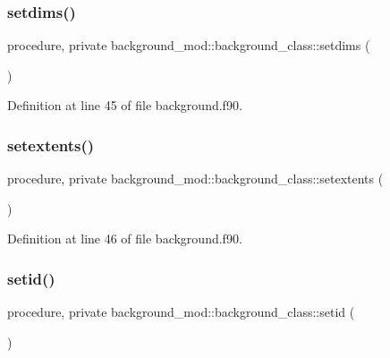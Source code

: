 \subsubsection{\texorpdfstring{setdims()}{setdims()}}
{\footnotesize\ttfamily procedure, private background\+\_\+mod\+::background\+\_\+class\+::setdims (\begin{DoxyParamCaption}{ }\end{DoxyParamCaption})\hspace{0.3cm}{\ttfamily [private]}}



Definition at line 45 of file background.\+f90.

\mbox{\label{structbackground__mod_1_1background__class_a2265e90a0a0685465a17721576919af5}} 
\subsubsection{\texorpdfstring{setextents()}{setextents()}}
{\footnotesize\ttfamily procedure, private background\+\_\+mod\+::background\+\_\+class\+::setextents (\begin{DoxyParamCaption}{ }\end{DoxyParamCaption})\hspace{0.3cm}{\ttfamily [private]}}



Definition at line 46 of file background.\+f90.

\mbox{\label{structbackground__mod_1_1background__class_aa9fde21edbd805c17a6610d9db2ef4a4}} 
\subsubsection{\texorpdfstring{setid()}{setid()}}
{\footnotesize\ttfamily procedure, private background\+\_\+mod\+::background\+\_\+class\+::setid (\begin{DoxyParamCaption}{ }\end{DoxyParamCaption})\hspace{0.3cm}{\ttfamily [private]}}



